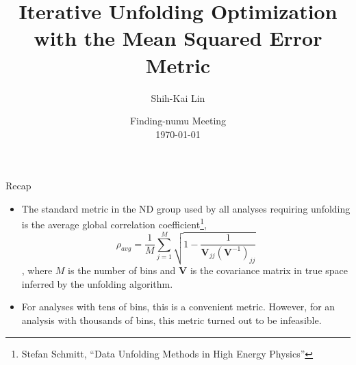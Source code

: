 \documentclass[aspectratio=169]{beamer}
\title{Iterative Unfolding Optimization with the Mean Squared Error Metric}
\date[today]{Finding-numu Meeting\\ \today}
\author{Shih-Kai Lin}
\institute{Colorado State University}
\begin{document}
\begin{frame}
\titlepage
\end{frame}

\begin{frame}{Recap}
  \begin{itemize}
    \item The standard metric in the ND group used by all analyses requiring unfolding is the average global correlation coefficient\footnote[frame]{Stefan Schmitt, ``Data Unfolding Methods in High Energy Physics''},
      \begin{equation} \label{eq:1}
        \rho_{avg}=\frac{1}{M}\sum_{j=1}^{M}\sqrt{1-\frac{1}{\pmb{V}_{jj}(\pmb{V}^{-1})_{jj}}}
      \end{equation}
    , where $M$ is the number of bins and $\pmb{V}$ is the covariance matrix in true space inferred by the unfolding algorithm.
    \item For analyses with tens of bins, this is a convenient metric. However, for an analysis with thousands of bins, this metric turned out to be infeasible.
  \end{itemize}
\end{frame}
\end{document}
